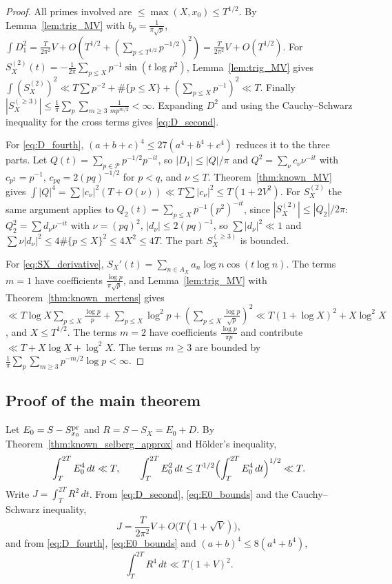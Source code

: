 \documentclass[11pt,reqno]{amsart}
\theoremstyle{plain}\newtheorem{theorem}{Theorem}[section]\newtheorem{proposition}[theorem]{Proposition}\newtheorem{lemma}[theorem]{Lemma}\newtheorem{corollary}[theorem]{Corollary}
\theoremstyle{definition}\newtheorem{hypothesis}[theorem]{Hypothesis}\newtheorem{definition}[theorem]{Definition}
\theoremstyle{remark}\newtheorem{remark}[theorem]{Remark}\newtheorem{experiment}[theorem]{Experiment}\newtheorem{question}[theorem]{Question}\newtheorem{heuristic}[theorem]{Heuristic}\newtheorem{conjecture}[theorem]{Conjecture}
\begin{document}
\begin{proof}
All primes involved are $\le\max(X,x_0)\le T^{1/2}$. By Lemma~\ref{lem:trig_MV} with $b_p=\frac1{\pi\sqrt p}$, $\int D_1^2=\frac T{2\pi^2}V+O(T^{1/2}+(\sum_{p\le T^{1/2}}p^{-1/2})^2)=\frac T{2\pi^2}V+O(T^{1/2})$. For $S_X^{(2)}(t)=-\frac1{2\pi}\sum_{p\le X}p^{-1}\sin(t\log p^2)$, Lemma~\ref{lem:trig_MV} gives $\int(S_X^{(2)})^2\ll T\sum p^{-2}+\#\{p\le X\}+(\sum_{p\le X}p^{-1})^2\ll T$. Finally $|S_X^{(\ge3)}|\le\frac1\pi\sum_p\sum_{m\ge3}\frac1{mp^{m/2}}<\infty$. Expanding $D^2$ and using the Cauchy--Schwarz inequality for the cross terms gives \eqref{eq:D_second}.

For \eqref{eq:D_fourth}, $(a+b+c)^4\le27(a^4+b^4+c^4)$ reduces it to the three parts. Let $Q(t)=\sum_{p\in\mathcal P}p^{-1/2}p^{-it}$, so $|D_1|\le|Q|/\pi$ and $Q^2=\sum_\nu c_\nu \nu^{-it}$ with $c_{p^2}=p^{-1}$, $c_{pq}=2(pq)^{-1/2}$ for $p<q$, and $\nu\le T$. Theorem~\ref{thm:known_MV} gives $\int|Q|^4=\sum|c_\nu|^2(T+O(\nu))\ll T\sum|c_\nu|^2\le T(1+2V^2)$. For $S_X^{(2)}$ the same argument applies to $Q_2(t)=\sum_{p\le X}p^{-1}(p^2)^{-it}$, since $|S_X^{(2)}|\le|Q_2|/2\pi$: $Q_2^2=\sum d_\nu\nu^{-it}$ with $\nu=(pq)^2$, $|d_\nu|\le2(pq)^{-1}$, so $\sum|d_\nu|^2\ll1$ and $\sum\nu|d_\nu|^2\le4\#\{p\le X\}^2\le4X^2\le4T$. The part $S_X^{(\ge3)}$ is bounded.

For \eqref{eq:SX_derivative}, $S_X'(t)=\sum_{n\in A_X}a_n\log n\cos(t\log n)$. The terms $m=1$ have coefficients $\frac{\log p}{\pi\sqrt p}$, and Lemma~\ref{lem:trig_MV} with Theorem~\ref{thm:known_mertens} gives $\ll T\log X\sum_{p\le X}\frac{\log p}p+\sum_{p\le X}\log^2p+(\sum_{p\le X}\frac{\log p}{\sqrt p})^2\ll T(1+\log X)^2+X\log^2X$, and $X\le T^{1/2}$. The terms $m=2$ have coefficients $\frac{\log p}{\pi p}$ and contribute $\ll T+X\log X+\log^2X$. The terms $m\ge3$ are bounded by $\frac1\pi\sum_p\sum_{m\ge3}p^{-m/2}\log p<\infty$.
\end{proof}

\subsection{Proof of the main theorem}
\label{subsec:main_proof}

Let $E_0=S-S^{\rm pr}_{x_0}$ and $R=S-S_X=E_0+D$. By Theorem~\ref{thm:known_selberg_approx} and Hölder's inequality,
\begin{equation}
\int_T^{2T}E_0^4\,dt\ll T,\qquad\int_T^{2T}E_0^2\,dt\le T^{1/2}\Bigl(\int_T^{2T}E_0^4\,dt\Bigr)^{1/2}\ll T .
\label{eq:E0_bounds}
\end{equation}
Write $J=\int_T^{2T}R^2\,dt$. From \eqref{eq:D_second}, \eqref{eq:E0_bounds} and the Cauchy--Schwarz inequality,
\begin{equation}
J=\frac T{2\pi^2}V+O\bigl(T(1+\sqrt V)\bigr),
\label{eq:J_asymptotic}
\end{equation}
and from \eqref{eq:D_fourth}, \eqref{eq:E0_bounds} and $(a+b)^4\le8(a^4+b^4)$,
\begin{equation}
\int_T^{2T}R^4\,dt\ll T(1+V)^2 .
\label{eq:R_fourth}
\end{equation}
\end{document}
